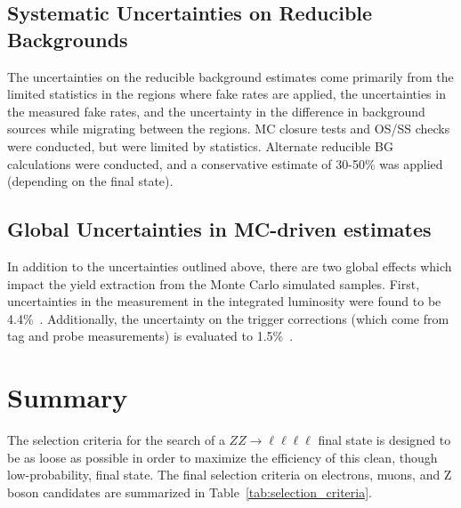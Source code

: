 \subsection{Systematic Uncertainties on Reducible Backgrounds}
The uncertainties on the reducible background estimates come primarily from the
limited statistics in the regions where fake rates are applied, the
uncertainties in the measured fake rates, and the uncertainty in the
difference in background sources while migrating between the regions. MC closure
tests and OS/SS checks were conducted, but were limited by statistics. Alternate
reducible BG calculations were conducted, and a conservative estimate of 30-50\%
was applied (depending on the final state).

\subsection{Global Uncertainties in MC-driven estimates}
In addition to the uncertainties outlined above, there are two global effects
which impact the yield extraction from the Monte Carlo simulated samples. First,
uncertainties in the measurement in the integrated luminosity were found to be
4.4\%~\cite{lumi}. Additionally, the uncertainty on the trigger corrections (which come from
tag and probe measurements) is evaluated to 1.5\%~\cite{zzHiggsMoriond}.

\section{Summary}
The selection criteria for the search of a $ZZ\rightarrow \ell\ell\ell\ell$
final state is designed to be as loose as possible in order to maximize the
efficiency of this clean, though low-probability, final state. The final
selection criteria on electrons, muons, and Z boson candidates are summarized in
Table~\ref{tab:selection_criteria}.


